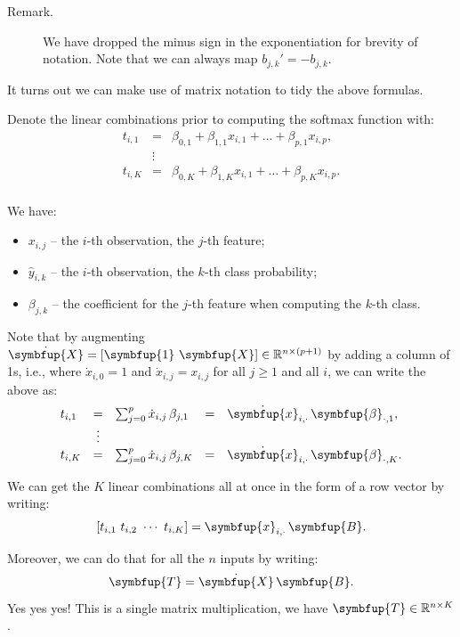 \documentclass[10pt,b5paper,krantz1]{krantz}
\providecommand{\tightlist}{%
  \setlength{\itemsep}{0pt}\setlength{\parskip}{0pt}}
\renewcommand{\mathbf}[1]{\symbfup{#1}}
\renewcommand{\boldsymbol}[1]{\symbfup{#1}}
\begin{document}
\begin{description}
\item[Remark.]
We have dropped the minus sign in the exponentiation for
brevity of notation.
Note that we can always map \(b_{j,k}'=-b_{j,k}\).
\end{description}

It turns out we can make use of matrix notation
to tidy the above formulas.

Denote the linear combinations prior to computing the softmax function with:
\[
\begin{array}{lcl}
t_{i,1}&=&\beta_{0,1} + \beta_{1,1} x_{i,1} +  \dots + \beta_{p,1} x_{i,p},\\
&\vdots&\\
t_{i,K}&=&\beta_{0,K} + \beta_{1,K} x_{i,1} +  \dots + \beta_{p,K} x_{i,p}.\\
\end{array}
\]

We have:

\begin{itemize}
\tightlist
\item
  \(x_{i,j}\) -- the \(i\)-th observation, the \(j\)-th feature;
\item
  \(\hat{y}_{i,k}\) -- the \(i\)-th observation, the \(k\)-th class probability;
\item
  \(\beta_{j,k}\) -- the coefficient for the \(j\)-th feature when computing the \(k\)-th class.
\end{itemize}

Note that by augmenting \(\dot{\mathbf{X}}=[\boldsymbol{1}\ \mathbf{X}]\in\mathbb{R}^{n\times (p+1)}\) by adding a column of 1s, i.e.,
where \(\dot{x}_{i,0}=1\) and \(\dot{x}_{i,j}=x_{i,j}\) for all \(j\ge 1\) and all \(i\), we can write the above as:
\[
\begin{array}{lclcl}
t_{i,1}&=&\sum_{j=0}^p \dot{x}_{i,j}\, \beta_{j,1} &=& \dot{\mathbf{x}}_{i,\cdot}\, \boldsymbol\beta_{\cdot,1},\\
&\vdots&\\
t_{i,K}&=&\sum_{j=0}^p \dot{x}_{i,j}\, \beta_{j,K} &=& \dot{\mathbf{x}}_{i,\cdot}\, \boldsymbol\beta_{\cdot,K}.\\
\end{array}
\]

We can get the \(K\) linear combinations all at once
in the form of a row vector by writing:
\[
\left[
t_{i,1}\ t_{i,2}\ \cdots\ t_{i,K}
\right]
=
{\mathbf{x}_{i,\cdot}}\, \mathbf{B}.
\]

Moreover, we can do that for all the \(n\) inputs by writing:
\[
\mathbf{T}=\dot{\mathbf{X}}\,\mathbf{B}.
\]
Yes yes yes! This is a single matrix multiplication,
we have \(\mathbf{T}\in\mathbb{R}^{n\times K}\).
\end{document}
